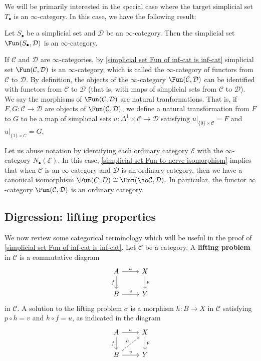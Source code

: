 We will be primarily interested in the special case where the target simplicial set $T_\bullet$ is an $\infty$-category. In this case, we have the following result:
\begin{theorem}\label{simplicial set Fun of inf-cat is inf-cat}
Let $S_\bullet$ be a simplicial set and $\mathcal{D}$ be an $\infty$-category. Then the simplicial set $\Fun(S_\bullet,\mathcal{D})$ is an $\infty$-category.
\end{theorem}
If $\mathcal{C}$ and $\mathcal{D}$ are $\infty$-categories, by \cref{simplicial set Fun of inf-cat is inf-cat} simplicial set $\Fun(\mathcal{C},\mathcal{D})$ is an $\infty$-category, which is called the $\infty$-category of functors from $\mathcal{C}$ to $\mathcal{D}$. By definition, the objects of the $\infty$-category $\Fun(\mathcal{C},\mathcal{D})$ can be identified with functors from $\mathcal{C}$ to $\mathcal{D}$ (that is, with maps of simplicial sets from $\mathcal{C}$ to $\mathcal{D}$). We say the morphisms of $\Fun(\mathcal{C},\mathcal{D})$ are natural tranformations. That is, if $F,G:\mathcal{C}\to\mathcal{D}$ are objects of $\Fun(\mathcal{C},\mathcal{D})$, we define a natural transformation from $F$ to $G$ to be a map of simplicial sets $u:\Delta^1\times\mathcal{C}\to\mathcal{D}$ satisfying $u|_{\{0\}\times\mathcal{C}}=F$ and $u|_{\{1\}\times\mathcal{C}}=G$.\par
Let us abuse notation by identifying each ordinary category $\mathcal{E}$ with the $\infty$-category $N_\bullet(\mathcal{E})$. In this case, \cref{simplicial set Fun to nerve isomorphism} implies that when $\mathcal{C}$ is an $\infty$-category and $\mathcal{D}$ is an ordinary category, then we have a canonical isomorphism $\Fun(C,D)\cong\Fun(\ho\mathcal{C},\mathcal{D})$. In particular, the functor $\infty$-category $\Fun(\mathcal{C},\mathcal{D})$ is an ordinary category.
\subsection{Digression: lifting properties}
We now review some categorical terminology which will be useful in the proof of \cref{simplicial set Fun of inf-cat is inf-cat}. Let $\mathcal{C}$ be a category. A \textbf{lifting problem} in $\mathcal{C}$ is a commutative diagram
\[\begin{tikzcd}
A\ar[r,"u"]\ar[d,swap,"f"]&X\ar[d,"p"]\\
B\ar[r,"v"]&Y
\end{tikzcd}\]
in $\mathcal{C}$. A solution to the lifting problem $\sigma$ is a morphism $h:B\to X$ in $\mathcal{C}$ satisfying $p\circ h=v$ and $h\circ f=u$, as indicated in the diagram
\[\begin{tikzcd}
A\ar[r,"u"]\ar[d,swap,"f"]&X\ar[d,"p"]\\
B\ar[r,"v"]\ar[ru,dashed,"h"]&Y
\end{tikzcd}\]

